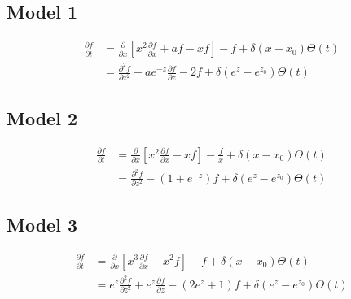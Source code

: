\documentclass{article}
\begin{document}
\subsection{Model 1}
    \begin{equation}
        \begin{split}
            \frac{\partial f} {\partial t} &= \frac{\partial}{\partial x}
            \left[x^2 \frac{\partial f}{\partial x} + af - xf\right]
             - f 
             + \delta(x-x_0)\Theta(t)
             \\
            &= \frac{\partial^2 f}{\partial z^2}
            + ae^{-z} \frac{\partial f}{\partial z}
            - 2f
            + \delta(e^{z}-e^{z_0})\Theta(t)
        \end{split}
    \end{equation}

\subsection{Model 2}
    \begin{equation}
        \begin{split}
            \frac{\partial f} {\partial t} &= \frac{\partial}{\partial x}
            \left[x^2 \frac{\partial f}{\partial x} - xf\right]
             - \frac{f}{x}
             + \delta(x-x_0)\Theta(t)
             \\
            &= \frac{\partial^2 f}{\partial z^2}
            - \left(1+e^{-z}\right) f
            + \delta(e^{z}-e^{z_0})\Theta(t)
        \end{split}
    \end{equation}

\subsection{Model 3}
    \begin{equation}
        \begin{split}
            \frac{\partial f} {\partial t} &= \frac{\partial}{\partial x}
            \left[x^3 \frac{\partial f}{\partial x} - x^2f\right]
             - f
             + \delta(x-x_0)\Theta(t)
             \\
            &= e^{z}\frac{\partial^2 f}{\partial z^2}
            +  e^{z} \frac{\partial f}{\partial z}
            - \left(2e^z+1\right) f
            + \delta(e^{z}-e^{z_0})\Theta(t)
        \end{split}
    \end{equation}
\end{document}
